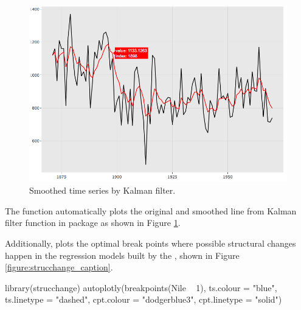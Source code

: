 \begin{figure}[htbp]
  \centering
  \includegraphics[width=145mm,scale=0.8]{images/dlm_caption.png}
  \caption{Smoothed time series by Kalman filter.}
  \label{figure:dlm_caption}
\end{figure}

The  function automatically plots the original and
smoothed line from Kalman filter function in  package as shown
in Figure \ref{figure:dlm_caption}.

\begin{Schunk}
\end{Schunk}

Additionally,  plots the optimal break points where possible structural changes happen in the regression models built by the , shown in Figure \ref{figure:strucchange_caption}.

\begin{Schunk}
\begin{Sinput}
library(strucchange)
autoplotly(breakpoints(Nile ~ 1), ts.colour = "blue", ts.linetype = "dashed",
           cpt.colour = "dodgerblue3", cpt.linetype = "solid")
\end{Sinput}
\end{Schunk}

